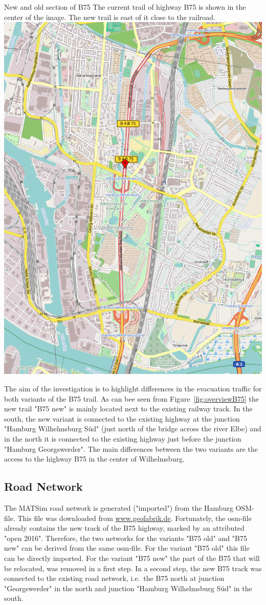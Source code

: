 \createfigure%
	{New and old section of B75}%
	{The current trail of highway B75 is shown in the center of the image. The new trail is east of it close to the railroad.}%
	{\label{fig:overviewB75}}%
	{\includegraphics[width=0.7\linewidth]{using/figures/B75overview}}%
{}

The aim of the investigation is to highlight differences in the evacuation traffic for both variants of the B75 trail. As can bee seen from Figure~\ref{fig:overviewB75} the new trail "B75 new" is mainly located next to the existing railway track.
In the south, the new variant is connected to the existing highway at the junction "Hamburg Wilhelmsburg Süd" (just north of the bridge across the river Elbe) and in the north it is connected to the existing highway just before the junction "Hamburg Georgswerder". 
The main differences between the two variants are the access to the highway B75 in the center of Wilhelmsburg.

\subsection{Road Network}
The MATSim road network is generated ("imported") from the Hamburg OSM-file. This file was downloaded from \url{www.geofabrik.de}. Fortunately, the osm-file already contains the new track of the B75 highway, marked by an attributed "open 2016". Therefore, the two networks for the variants "B75 old" and "B75 new" can be derived from the same osm-file. For the variant "B75 old" this file can be directly imported. For the variant "B75 new" the part of the B75 that will be relocated, was removed in a first step. In a second step, the new B75 track was connected to the existing road network, i.e.\ the B75 north at junction "Georgswerder" in the north and junction "Hamburg Wilhelmsburg Süd" in the south.

